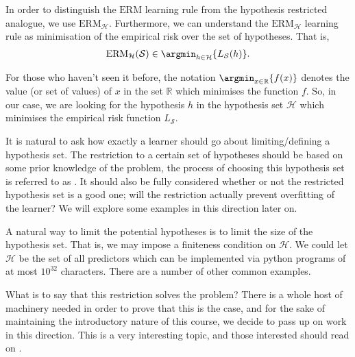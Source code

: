 In order to distinguish the $ \mathrm{ERM} $ learning rule from the hypothesis restricted analogue, we use $ \mathrm{ERM}_{\mathcal{H}} $. Furthermore, we can understand the $ \mathrm{ERM}_{\mathcal{H}} $ learning rule as minimisation of the empirical risk over the set of hypotheses. That is,
\begin{align*}
	\mathrm{ERM}_{\mathcal{H}}( \mathcal{S} ) \in \argmin_{h \in \mathcal{H}}\{ L_{\mathcal{S}}( h ) \}.
\end{align*}

\begin{notation}
	For those who haven't seen it before, the notation $ \argmin_{x \in \mathbb{R}}\{ f ( x ) \} $ denotes the value (or set of values) of $ x $ in the set $ \mathbb{R} $ which minimises the function $ f $. So, in our case, we are looking for the hypothesis $ h $ in the hypothesis set $ \mathcal{H} $ which minimises the empirical risk function $ L_{\mathcal{S}} $.
\end{notation}

It is natural to ask how exactly a learner should go about limiting/defining a hypothesis set. The restriction to a certain set of hypotheses should be based on some prior knowledge of the problem, the process of choosing this hypothesis set is referred to as . It should also be fully considered whether or not the restricted hypothesis set is a good one; will the restriction actually prevent overfitting of the learner? We will explore some examples in this direction later on.

\begin{example}
	A natural way to limit the potential hypotheses is to limit the size of the hypothesis set. That is, we may impose a finiteness condition on $ \mathcal{H} $. We could let $ \mathcal{H} $ be the set of all predictors which can be implemented via python programs of at most $ 10^{32} $ characters. There are a number of other common examples.
\end{example}

\begin{remark}
	What is to say that this restriction solves the problem? There is a whole host of machinery needed in order to prove that this is the case, and for the sake of maintaining the introductory nature of this course, we decide to pass up on work in this direction. This is a very interesting topic, and those interested should read on .
\end{remark}

